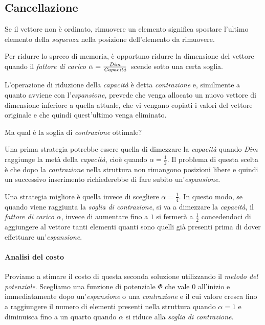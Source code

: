 \subsection{Cancellazione}
Se il vettore non è ordinato, rimuovere un elemento significa spostare l'ultimo
elemento della \emph{sequenza} nella posizione dell'elemento da rimuovere.

Per ridurre lo spreco di memoria, è opportuno ridurre la dimensione del vettore
quando il \emph{fattore di carico} $\alpha=\frac{\emph{Dim}}
{\emph{Capacità}}$\footnotemark\ scende sotto una certa soglia.

L'operazione di riduzione della \emph{capacità} è detta \emph{contrazione} e,
similmente a quanto avviene con l'\emph{espansione}, prevede che venga allocato un nuovo
vettore di dimensione inferiore a quella attuale, che vi vengano copiati i
valori del vettore originale e che quindi quest'ultimo venga eliminato.

\bigskip\noindent
Ma qual è la soglia di \emph{contrazione} ottimale?

Una prima strategia potrebbe essere quella di dimezzare la \emph{capacità} quando
\emph{Dim} raggiunge la metà della \emph{capacità}, cioè quando $\alpha=
\frac{1}{2}$. Il problema di questa scelta è che dopo la \emph{contrazione}
nella struttura non rimangono posizioni libere e quindi un successivo inserimento
richiederebbe di fare subito un'\emph{espansione}.

Una strategia migliore è quella invece di scegliere $\alpha=\frac{1}{4}$. In
questo modo, se quando viene raggiunta la \emph{soglia di contrazione}, si va
a dimezzare la \emph{capacità}, il \emph{fattore di carico} $\alpha$, invece di
aumentare fino a $1$ si fermerà a $\frac{1}{2}$ concedendoci di aggiungere al
vettore tanti elementi quanti sono quelli già presenti prima di dover effettuare
un'\emph{espansione}.

\paragraph{Analisi del costo}
Proviamo a stimare il costo di questa seconda soluzione utilizzando il
\emph{metodo del potenziale}. Scegliamo una funzione di potenziale $\Phi$ che
vale 0 all'inizio e immediatamente dopo un'\emph{espansione} o una
\emph{contrazione} e il cui valore cresca fino a raggiungere il numero di
elementi presenti nella struttura quando $\alpha=1$ e diminuisca fino a un
quarto quando $\alpha$ si riduce alla \emph{soglia di contrazione}.

